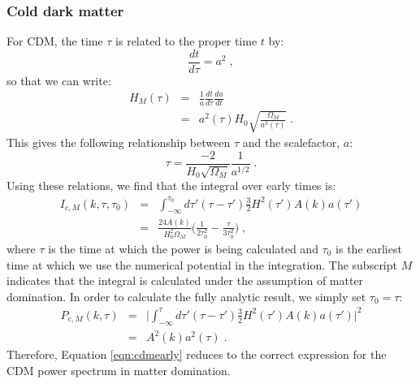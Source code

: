 \documentclass{aastex}
\begin{document}
\subsubsection{Cold dark matter}\label{sec:CDMmatter}
For CDM, the time $\tau$ is related to the proper
time $t$ by:
\begin{equation}
  \frac{ d t}{ d \tau} = a^2 \;,
\end{equation}
so that we can write:
\begin{equation}
\begin{array}{rcl}
  H_M(\tau) &=& \frac{1}{a} \frac{d t}{ d \tau} \frac{da}{dt}\\[1em]
  &=& a^2(\tau) H_0 \sqrt{ \frac{\Omega_M}{a^3(\tau)}} \;.
\end{array}
\end{equation}
This gives the following relationship between $\tau$ and the
scalefactor, $a$:
\begin{equation}
  \tau = \frac{-2}{H_0 \sqrt{\Omega_M} } \frac{1}{a^{1/2} } \;.
\end{equation}
Using these relations, we find that the integral over early times is:
\begin{equation}\label{eqn:cdmearly}
\begin{array}{rcl}
  I_{c,M}(k,\tau,\tau_0) &=& \int_{-\infty}^{\tau_0}d\tau' (\tau-\tau') \frac{3}{2}
              H^2(\tau') A(k) a(\tau')\\[1em]
          &=& \frac{24 A(k)}{H_0^2 \Omega_M} \bigg( \frac{1}{2 \tau_0^2} - \frac{
       \tau}{3 \tau_0^2} \bigg)\;,
\end{array}
\end{equation}
where $\tau$ is the time at which the power is being calculated and
$\tau_0$ is the earliest time at which we use the numerical potential
in the integration.  The subscript $M$ indicates that the integral is
calculated under the assumption of matter domination.  In
order to calculate the fully analytic result, we simply set
$\tau_0 = \tau$:
\begin{equation}
\begin{array}{rcl}
  P_{c,M}(k,\tau) &=& \bigg|\int_{-\infty}^{\tau} d\tau' (\tau - \tau')\frac{3}{2} H^2(\tau') A(k)
  a(\tau')\bigg|^2 \\[1em]
& = &A^2(k)
    a^2(\tau) \;.
\end{array}
\end{equation}
Therefore, Equation \eqref{eqn:cdmearly} reduces to the
correct expression for the CDM power spectrum in matter
domination. 
\end{document}
